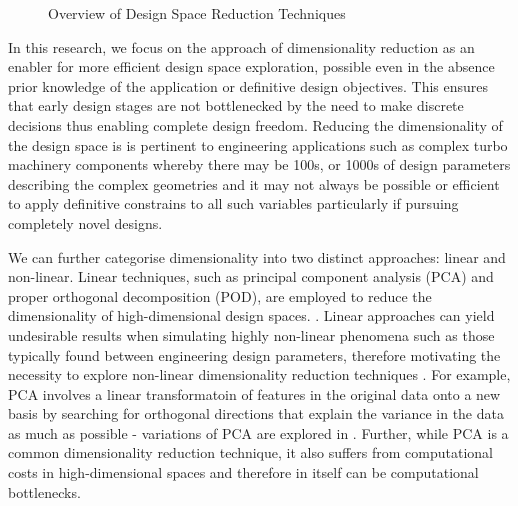 \documentclass{article}
\begin{document}
\begin{figure}[h!]
\centering
{}
\caption{Overview of Design Space Reduction Techniques}
\end{figure}

In this research, we focus on the approach of dimensionality reduction as an enabler for more efficient design space exploration, possible even in the absence prior knowledge of the application or definitive design objectives. This ensures that early design stages are not bottlenecked by the need to make discrete decisions thus enabling complete design freedom. Reducing the dimensionality of the design space is is pertinent to engineering applications such as complex turbo machinery components whereby there may be 100s, or 1000s of design parameters describing the complex geometries and it may not always be possible or efficient to apply definitive constrains to all such variables particularly if pursuing completely novel designs.

We can further categorise dimensionality into two distinct approaches: linear and non-linear. Linear techniques, such as principal component analysis (PCA) and proper orthogonal decomposition (POD), are employed to reduce the dimensionality of high-dimensional design spaces.  \citep{Diez2024}. Linear approaches can yield undesirable results when simulating highly non-linear phenomena \citep{Deshpande2024} such as those typically found between engineering design parameters, therefore motivating the necessity to explore non-linear dimensionality reduction techniques \citep{Diez2024}. For example, PCA involves a linear transformatoin of features in the original data onto a new basis \citep{Donnelly2024} by searching for orthogonal directions that explain the variance in the data as much as possible - variations of PCA are explored in \cite{Sorzano2014}. Further, while PCA is a common dimensionality reduction technique, it also suffers from computational costs in high-dimensional spaces \citep{Donnelly2024} and therefore in itself can be computational bottlenecks.
\end{document}
